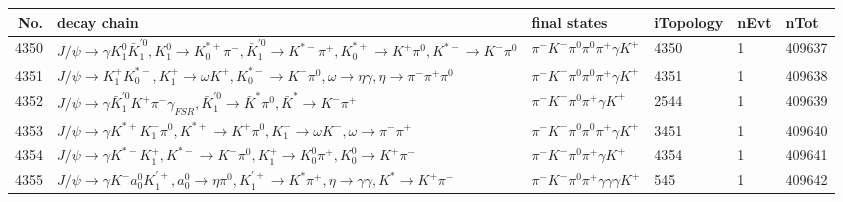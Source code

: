 \begin{table}[htbp] 
\begin{center}
\begin{small}
\begin{tabular}{rlllll}\hline\hline
 No. & decay chain & final states &  iTopology & nEvt & nTot \\\hline
4350&$J/\psi       \rightarrow \gamma       K_1^{0}        \bar{K}_1^{'0}, K_1^{0}         \rightarrow K_{0}^{*+}     \pi^{-}        , \bar{K}_1^{'0} \rightarrow K^{*-}         \pi^{+}        , K_{0}^{*+}      \rightarrow K^{+}          \pi^{0}        , K^{*-}          \rightarrow K^{-}          \pi^{0}        $&$\pi^{-}        K^{-}          \pi^{0}        \pi^{0}        \pi^{+}        \gamma       K^{+}          $& 4350&    1&409637\\
4351&$J/\psi       \rightarrow K_1^{+}        K_{0}^{*-}     , K_1^{+}         \rightarrow \omega         K^{+}          , K_{0}^{*-}      \rightarrow K^{-}          \pi^{0}        , \omega          \rightarrow \eta          \gamma       , \eta           \rightarrow \pi^{-}        \pi^{+}        \pi^{0}        $&$\pi^{-}        K^{-}          \pi^{0}        \pi^{0}        \pi^{+}        \gamma       K^{+}          $& 4351&    1&409638\\
4352&$J/\psi       \rightarrow \gamma       \bar{K}_1^{'0}K^{+}          \pi^{-}        \gamma_{FSR} , \bar{K}_1^{'0} \rightarrow \bar{K}^{*}   \pi^{0}        , \bar{K}^{*}    \rightarrow K^{-}          \pi^{+}        $&$\pi^{-}        K^{-}          \pi^{0}        \pi^{+}        \gamma       K^{+}          $& 2544&    1&409639\\
4353&$J/\psi       \rightarrow \gamma       K^{*+}         K_{1}^{-}      \pi^{0}        , K^{*+}          \rightarrow K^{+}          \pi^{0}        , K_{1}^{-}       \rightarrow \omega         K^{-}          , \omega          \rightarrow \pi^{-}        \pi^{+}        $&$\pi^{-}        K^{-}          \pi^{0}        \pi^{0}        \pi^{+}        \gamma       K^{+}          $& 3451&    1&409640\\
4354&$J/\psi       \rightarrow \gamma       K^{*-}         K_1^{+}        , K^{*-}          \rightarrow K^{-}          \pi^{0}        , K_1^{+}         \rightarrow K_0^{0}        \pi^{+}        , K_0^{0}         \rightarrow K^{+}          \pi^{-}        $&$\pi^{-}        K^{-}          \pi^{0}        \pi^{+}        \gamma       K^{+}          $& 4354&    1&409641\\
4355&$J/\psi       \rightarrow \gamma       K^{-}          a_{0}^{0}      K_1^{'+}      , a_{0}^{0}       \rightarrow \eta          \pi^{0}        , K_1^{'+}       \rightarrow K^{*}          \pi^{+}        , \eta           \rightarrow \gamma       \gamma       , K^{*}           \rightarrow K^{+}          \pi^{-}        $&$\pi^{-}        K^{-}          \pi^{0}        \pi^{+}        \gamma       \gamma       \gamma       K^{+}          $&  545&    1&409642\\

\end{tabular}
\end{small}
\end{center}
\end{table}
